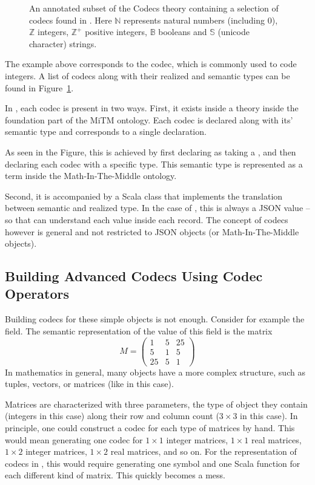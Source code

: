 \begin{figure}[h!]
  \caption[List of Codecs]{
    An annotated subset of the Codecs theory containing a selection of codecs found in \mmt. 
    Here $\mathbb{N}$ represents natural numbers (including $0$), 
    $\mathbb{Z}$ integers, 
    $\mathbb{Z}^{+}$ positive integers, 
    $\mathbb{B}$ booleans and
    $\mathbb{S}$ (unicode character) strings. 
  }
  \label{fig:codecs}
\end{figure}
The example above corresponds to the  codec, which is commonly used to code integers. 
A list of codecs along with their realized and semantic types can be found in Figure~\ref{fig:codecs}. 

In \mmt, each codec is present in two ways.
First, it exists inside a  theory inside the foundation part of the MiTM ontology. 
Each codec is declared along with its' semantic type and corresponds to a single declaration. 

As seen in the Figure, this is achieved by first declaring  as taking a , and then declaring each codec with a specific type. 
This semantic type is represented as a term inside the Math-In-The-Middle ontology. 

Second, it is accompanied by a Scala class that implements the translation between semantic and realized type. 
In the case of \lmfdb, this is always a JSON value -- so that \mmt can understand each value inside each \lmfdb record. 
The concept of codecs however is general and not restricted to JSON objects (or Math-In-The-Middle objects). 

\subsection{Building Advanced Codecs Using Codec Operators}\label{sec:vt:operators}

Building codecs for these simple objects is not enough. 
Consider for example the  field. 
The semantic representation of the value of this field is the matrix
\[M = \left(
    \begin{array}{ccc}
      1 & 5 & 25 \\
      5 & 1 & 5 \\
      25 & 5 & 1 \end{array} 
  \right)
\]
In mathematics in general, many objects have a more complex structure, such as tuples, vectors, or matrices (like in this case). 

Matrices are characterized with three parameters, the type of object they contain (integers in this case) along their row and column count ($3 \times 3$ in this case). 
In principle, one could construct a codec for each type of matrices by hand. 
This would mean generating one codec for $1 \times 1$ integer matrices, $1 \times 1$ real matrices, $1 \times 2$ integer matrices, $1 \times  2$ real matrices, and so on. 
For the representation of codecs in \mmt, this would require generating one symbol and one Scala function for each different kind of matrix. 
This quickly becomes a mess. 

